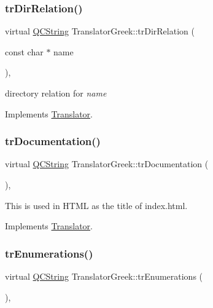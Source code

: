 \subsubsection{\texorpdfstring{trDirRelation()}{trDirRelation()}}
{\footnotesize\ttfamily virtual \mbox{\hyperlink{class_q_c_string}{Q\+C\+String}} Translator\+Greek\+::tr\+Dir\+Relation (\begin{DoxyParamCaption}\item[{const char $\ast$}]{name }\end{DoxyParamCaption})\hspace{0.3cm}{\ttfamily [inline]}, {\ttfamily [virtual]}}

directory relation for {\itshape name} 

Implements \mbox{\hyperlink{class_translator}{Translator}}.

\mbox{\label{class_translator_greek_aa1cf992ba34da1bfa4a82b7eafdc0805}} 
\subsubsection{\texorpdfstring{trDocumentation()}{trDocumentation()}}
{\footnotesize\ttfamily virtual \mbox{\hyperlink{class_q_c_string}{Q\+C\+String}} Translator\+Greek\+::tr\+Documentation (\begin{DoxyParamCaption}{ }\end{DoxyParamCaption})\hspace{0.3cm}{\ttfamily [inline]}, {\ttfamily [virtual]}}

This is used in H\+T\+ML as the title of index.\+html. 

Implements \mbox{\hyperlink{class_translator}{Translator}}.

\mbox{\label{class_translator_greek_a6e2f224959a511e14182e562954df9c2}} 
\subsubsection{\texorpdfstring{trEnumerations()}{trEnumerations()}}
{\footnotesize\ttfamily virtual \mbox{\hyperlink{class_q_c_string}{Q\+C\+String}} Translator\+Greek\+::tr\+Enumerations (\begin{DoxyParamCaption}{ }\end{DoxyParamCaption})\hspace{0.3cm}{\ttfamily [inline]}, {\ttfamily [virtual]}}

